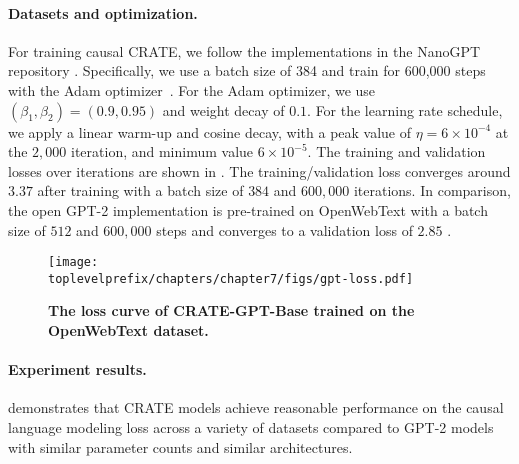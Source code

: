 \documentclass[../../book-main.tex]{subfiles}
\begin{document}
\paragraph{Datasets and optimization.} For training causal CRATE, we follow the implementations in the NanoGPT repository \citep{nanogpt}. Specifically, we use a batch size of 384 and train for 600,000 steps with the Adam optimizer~\citep{kingma2014adam}. For the Adam optimizer, we use $(\beta_1, \beta_2)=(0.9, 0.95)$ and weight decay of $0.1$. For the learning rate schedule, we apply a linear warm-up and cosine decay, with a peak value of $\eta=6\times 10^{-4}$ at the $2,000$ iteration, and minimum value $6\times 10^{-5}$. The training and validation losses over iterations are shown in . The training/validation loss converges around $3.37$ after training with a batch size of $384$ and $600,000$ iterations. In comparison, the open GPT-2 implementation is pre-trained on OpenWebText with a batch size of $512$ and $600,000$ steps and converges to a validation loss of $2.85$ \citep{nanogpt}.  

\begin{figure}
    \centering
    \texttt{[image: \\toplevelprefix/chapters/chapter7/figs/gpt-loss.pdf]}
    \caption{\bf The loss curve of CRATE-GPT-Base trained on the OpenWebText dataset.}
    \label{fig:crate-text-evals}
\end{figure}

\paragraph{Experiment results.}

 demonstrates that CRATE models achieve reasonable performance on the causal language modeling loss across a variety of datasets compared to GPT-2 models with similar parameter counts and similar architectures.
\end{document}
